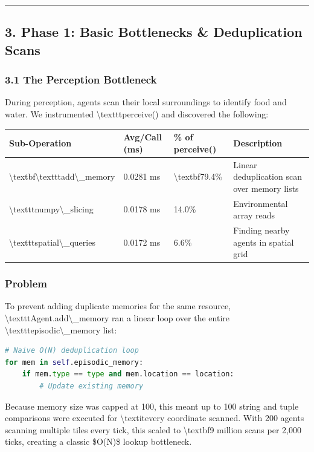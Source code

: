 \documentclass[11pt,a4paper]{article}
\begin{document}
\noindent\rule{\textwidth}{0.4pt}

\subsection*{3. Phase 1: Basic Bottlenecks \& Deduplication Scans}

\subsubsection*{3.1 The Perception Bottleneck}
During perception, agents scan their local surroundings to identify food and water. We instrumented \textbackslash{}texttt{perceive()} and discovered the following:

\begin{longtable}{llll}
\toprule
Sub-Operation & Avg/Call (ms) & \% of perceive() & Description \\
\midrule
\endhead
\textbackslash{}textbf{\textbackslash{}texttt{add\textbackslash{}\_memory}} & 0.0281 ms & \textbackslash{}textbf{79.4\%} & Linear deduplication scan over memory lists \\
\textbackslash{}texttt{numpy\textbackslash{}\_slicing} & 0.0178 ms & 14.0\% & Environmental array reads \\
\textbackslash{}texttt{spatial\textbackslash{}\_queries} & 0.0172 ms & 6.6\% & Finding nearby agents in spatial grid \\
\bottomrule
\end{longtable}

\subsubsection*{Problem}
To prevent adding duplicate memories for the same resource, \textbackslash{}texttt{Agent.add\textbackslash{}\_memory} ran a linear loop over the entire \textbackslash{}texttt{episodic\textbackslash{}\_memory} list:
\begin{lstlisting}[language=python]
# Naive O(N) deduplication loop
for mem in self.episodic_memory:
    if mem.type == type and mem.location == location:
        # Update existing memory
\end{lstlisting}
Because memory size was capped at 100, this meant up to 100 string and tuple comparisons were executed for \textbackslash{}textit{every} coordinate scanned. With 200 agents scanning multiple tiles every tick, this scaled to \textbackslash{}textbf{9 million scans per 2,000 ticks}, creating a classic \$O(N)\$ lookup bottleneck.
\end{document}
